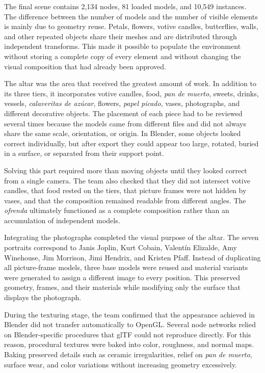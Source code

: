 \documentclass[letter,12pt]{article}
\begin{document}
	The final scene contains 2,134 nodes, 81 loaded models, and 10,549 instances. The difference between the number of models and the number of visible elements is mainly due to geometry reuse. Petals, flowers, votive candles, butterflies, walls, and other repeated objects share their meshes and are distributed through independent transforms. This made it possible to populate the environment without storing a complete copy of every element and without changing the visual composition that had already been approved.

	The altar was the area that received the greatest amount of work. In addition to its three tiers, it incorporates votive candles, food, \textit{pan de muerto}, sweets, drinks, vessels, \textit{calaveritas de azúcar}, flowers, \textit{papel picado}, vases, photographs, and different decorative objects. The placement of each piece had to be reviewed several times because the models came from different files and did not always share the same scale, orientation, or origin. In Blender, some objects looked correct individually, but after export they could appear too large, rotated, buried in a surface, or separated from their support point.

	Solving this part required more than moving objects until they looked correct from a single camera. The team also checked that they did not intersect votive candles, that food rested on the tiers, that picture frames were not hidden by vases, and that the composition remained readable from different angles. The \textit{ofrenda} ultimately functioned as a complete composition rather than an accumulation of independent models.

	Integrating the photographs completed the visual purpose of the altar. The seven portraits correspond to Janis Joplin, Kurt Cobain, Valentín Elizalde, Amy Winehouse, Jim Morrison, Jimi Hendrix, and Kristen Pfaff. Instead of duplicating all picture-frame models, three base models were reused and material variants were generated to assign a different image to every position. This preserved geometry, frames, and their materials while modifying only the surface that displays the photograph.

	During the texturing stage, the team confirmed that the appearance achieved in Blender did not transfer automatically to OpenGL. Several node networks relied on Blender-specific procedures that glTF could not reproduce directly. For this reason, procedural textures were baked into color, roughness, and normal maps. Baking preserved details such as ceramic irregularities, relief on \textit{pan de muerto}, surface wear, and color variations without increasing geometry excessively.
\end{document}
